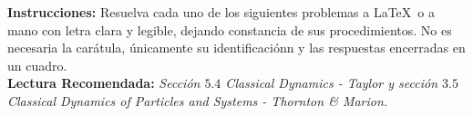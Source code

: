 

\usepackage{fancyhdr}%
\pagestyle{fancy}%
\fancyhead{}
\fancyhead[R]{\footnotesize{\thepage}}
\fancyfoot{}
\usepackage{fourier-orns}

\renewcommand\footrule{%
\hrulefill
\raisebox{-2.1pt}
{\quad\decosix\quad}%
\hrulefill}


\begin{titlepage}


\noindent \textbf{Instrucciones: } Resuelva cada uno de los siguientes problemas a \LaTeX $\,$ o a mano con letra clara y legible, dejando constancia de sus procedimientos. No es necesaria la carátula, únicamente su identificaciónn y las respuestas encerradas en un cuadro. \\
\textbf{Lectura Recomendada:} \textit{Sección $5.4$ Classical Dynamics - Taylor y sección $3.5$ Classical Dynamics of Particles and Systems - Thornton \& Marion.}



\end{titlepage}

